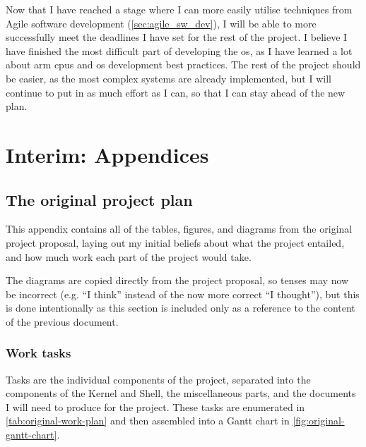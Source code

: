 \documentclass{article}
\begin{document}
Now that I have reached a stage where I can more easily utilise techniques from
Agile software development (\autoref{sec:agile_sw_dev}), I will be able to more
successfully meet the deadlines I have set for the rest of the project. I
believe I have finished the most difficult part of developing the \gls{os}, as
I have learned a lot about \gls{arm} \glspl{cpu} and \gls{os} development best
practices. The rest of the project should be easier, as the most complex
systems are already implemented, but I will continue to put in as much effort
as I can, so that I can stay ahead of the new plan.


\printglossaries

\nocite{osdev-wiki}
\nocite{unix-prog-env}
\printbibliography[heading=bibintoc]

\clearpage
\appendix
{}
\newrefsection
\section*{Interim: Appendices}
\renewcommand{\thesubsection}{\Alph{subsection}}
\subsection{The original project plan}
This appendix contains all of the tables, figures, and diagrams from the
original project proposal, laying out my initial beliefs about what the project
entailed, and how much work each part of the project would take.

The diagrams are copied directly from the project proposal, so tenses may now
be incorrect (e.g. ``I think'' instead of the now more correct ``I thought''),
but this is done intentionally as this section is included only as a reference
to the content of the previous document.

\subsubsection{Work tasks}
Tasks are the individual components of the project, separated into the
components of the Kernel and Shell, the miscellaneous parts, and the documents
I will need to produce for the project. These tasks are enumerated in
\autoref{tab:original-work-plan} and then assembled into a Gantt chart in
\autoref{fig:original-gantt-chart}.
\end{document}
